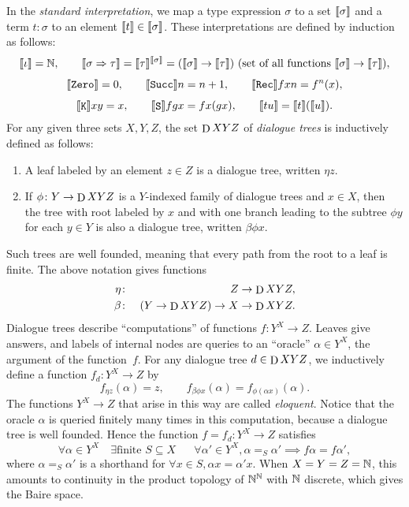 \documentclass{entcs} \usepackage{prentcsmacro}
\begin{document}
In the \emph{standard interpretation}, we map a type expression $\sigma$ to a set
$\llbracket \sigma \rrbracket$ and a term $t \colon \sigma$ to an element
$\llbracket t \rrbracket \in \llbracket \sigma \rrbracket$. These interpretations
are defined by induction as follows:
\begin{gather*}
\llbracket \iota \rrbracket  = \mathbb{N}, 
\qquad \llbracket \sigma \Rightarrow \tau \rrbracket = \llbracket \tau \rrbracket^{\llbracket \sigma \rrbracket} = ({\llbracket \sigma \rrbracket} \to \llbracket \tau \rrbracket) \,\,\text{(set of all functions $\llbracket \sigma \rrbracket \to \llbracket \tau \rrbracket$)}, \\[1ex]
\llbracket \mathop{\mathrm{\mathtt{Zero}}}\nolimits \rrbracket = 0,
\qquad \llbracket \mathop{\mathrm{\mathtt{Succ}}}\nolimits \rrbracket n = n+1,
\qquad \llbracket \mathop{\mathrm{\mathtt{Rec}}}\nolimits \rrbracket f x n  = f^n(x), \\[1ex]
\llbracket \mathop{\mathrm{\mathtt{K}}}\nolimits \rrbracket x y = x,
\qquad \llbracket \mathop{\mathrm{\mathtt{S}}}\nolimits \rrbracket f g x = fx(gx),
\qquad \llbracket tu \rrbracket = \llbracket t \rrbracket(\llbracket u \rrbracket).
\end{gather*}
For any given three sets $X,Y,Z$, the set $\mathop{\mathrm{D}}\nolimits X Y Z$ of \emph{dialogue trees}
is inductively defined as follows:
\begin{enumerate}
\item A leaf labeled by an element $z \in Z$ is a dialogue tree, written $\eta z$.
\item If $\phi \colon Y \to \mathop{\mathrm{D}}\nolimits X Y Z$ is a $Y$-indexed family of dialogue trees and $x \in X$, then the tree with root labeled by $x$ and with one branch leading to the subtree $\phi y$ for each $y \in Y$  is also a dialogue tree, written $\beta \phi x$.   
\end{enumerate}
Such trees are well founded, meaning that every path from the root to
a leaf is finite.  The above notation gives functions
\begin{eqnarray*}
  \eta & \colon & Z \to \mathop{\mathrm{D}}\nolimits X Y Z, \\
  \beta & \colon & (Y \to \mathop{\mathrm{D}}\nolimits X Y Z) \to X \to \mathop{\mathrm{D}}\nolimits X Y Z.
\end{eqnarray*}
Dialogue trees describe ``computations'' of functions $f \colon Y^X
\to Z$.  Leaves give answers, and labels of internal nodes are queries
to an ``oracle'' $\alpha \in Y^X$, the argument of the function~$f$.
For any dialogue tree $d \in \mathop{\mathrm{D}}\nolimits X Y Z$, we inductively define a function $f_d \colon
Y^X \to Z$ by
\[
f_{\eta z}(\alpha) = z, 
\qquad 
f_{\beta \phi x}(\alpha) = f_{\phi(\alpha x)}(\alpha).
\]
The functions $Y^X \to Z$ that arise in this way are called
\emph{eloquent}. Notice that the oracle $\alpha$ is queried
finitely many times in this computation, because a dialogue tree is
well founded. Hence the function $f = f_d \colon Y^X \to Z$
satisfies
\[
\forall \alpha \in Y^X \quad \exists \text{finite $S \subseteq X$ } \quad \forall \alpha' \in Y^X, \alpha =_S \alpha' \implies f\alpha=f\alpha',
\]
where $\alpha =_S \alpha'$ is a shorthand for $\forall x \in
S, \alpha x = \alpha'x$. When $X=Y=Z=\mathbb{N}$, this amounts to
continuity in the product topology of $\mathbb{N}^{\mathbb{N}}$ with $\mathbb{N}$ discrete,
which gives the Baire space. 
\end{document}

